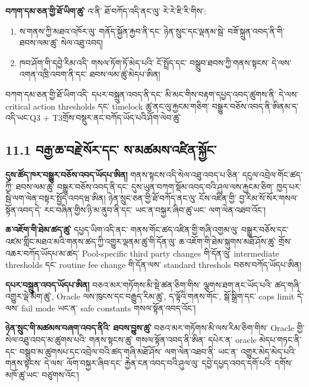 \documentclass[11pt]{article}
\begin{document}
\textbf{བཀག་དམ་ཅན་གྱི་ཐོ་ཡིག་ཚུ་} འ་ནི་ ཐོ་བཀོད་འདི་ནང་ལུ་ རེ་རེ་ཇི་རི་གིས་:

\begin{enumerate}[leftmargin=*]
\item ས་གནས་ཀྱི་མཐའ་འཁོར་ལུ་ གནོད་སྐྱོན་རྐྱབ་ནི་དང་ ཉེན་སྲུང་དང་ལྡནམ་སྦེ་ བཟོ་སྐྲུན་འབད་ནི་གི་ ཐབས་ལམ་ཚུ་ སེལ་འཐུ་འབད།
\item ཁབ་ཤོག་གི་དབྱེ་རིམ་འདི་ གསལ་ཏོག་ཏོ་མེད་པའི་ ངོ་སྤྲོད་དང་ བསྒྲུབ་ཐབས་ཀྱི་གནས་སྟངས་ དེ་ལས་ འགན་འཁྲི་འབག་ནི་དང་ ཐབས་ལམ་ཚུ་མེདཔ་ཨིན།
\end{enumerate}
བཀག་དམ་ཅན་གྱི་ཐོ་ཡིག་འདི་ དཔར་བསྐྲུན་འབད་ནི་དང་ མི་མང་གིས་བརྟག་དཔྱད་འབད་ཚུགས་ནི་ དེ་ལས་ critical action thresholds དང་ timelock ཚུ་ནང་ལུ་རྐྱངམ་གཅིག་ བསྒྱུར་བཅོས་འབད་ནི་ཨིནམ་ད་ འདི་ཡང་Q3 + T3གྲོས་བསྡུར་ནང་བཀོད་ཡོད་པའི་ཤོག་ལེབ་ཚུ་

\subsection*{11.1 བརྒྱ་ཆ་བརྗེ་སོར་དང་ ས་མཚམས་འཛིན་སྐྱོང་}

\textbf{དུས་ཚོད་ཁར་བསྒྱུར་བཅོས་འབད་ཡོདཔ་ཨིན།} གནས་སྟངས་འདི་སེལ་འཐུ་འབད་པ་ཅིན་ དངུལ་འབྲེལ་གོང་ཚད་ཀྱི་ ཐབས་ལམ་ཚུ་ བསྒྱུར་བཅོས་འབད་ནི་དང་ དུས་ཡུན་བཀག་སྡོམ་འབད་བའི་ཤུལ་ལས་རྐྱངམ་ཅིག་ ཁྱད་པར་སྦེ་ལག་ལེན་བསྟར་སྤྱོད་འབདཝ་ཨིན། ཉེན་སྲུང་ཅན་གྱི་ཐོ་བཀོད་ནང་ལུ་ ངོས་འཛིན་གྱི་ བྱ་རིམ་སོ་སོར་གསལ་སྟོན་འབད་དེ་ རང་བཞིན་གྱིས་ཉི་མ་ནུབ་ནི་དང་ ཡང་ན་བསྐྱར་ཞིབ་ཚུ་ཡང་ ལག་ལེན་འཐབ་འོང་།

\textbf{ཆ་འཇོག་གི་ཐེམ་ཚད་ཚུ་} དཔྱད་ཡིག་འདི་ནང་ གནས་གོང་ཚད་འཛིན་གྱི་གཞི་འགྱམ་ལུ་ བསྒྱུར་བཅོས་དང་ འཛམ་གླིང་མཐའ་མའི་གནས་ཚད་ཀྱི་འགྱུར་ལྡནམ་ཚུ་གི་དོན་ལུ་ ཆ་འཇོག་གི་ཐེམ་སྐུགས་མཐོ་ཤོས་ཚུ་ གྲོས་འཆར་བཀོད་ཡོདཔ་མ་ཚད་ Pool-specific third party changes གི་དོན་ལུ་ intermediate thresholds དང་ routine fee change གི་དོན་ལས་ standard threshols བཅས་བཀོད་ཡོདཔ་ཨིན།

\textbf{དཔར་བསྐྲུན་འབད་ཡོདཔ་ཨིན།} བཅའ་མར་གཏོགས་མི་སྡེ་ཚན་ཅིག་གིས་ ལྕགས་ཐག་ནང་ཡོད་པའི་ ཚད་གཞི་འགྱུར་ལྡེ་མིག་ཚུ་, Oracle ལས་ཁུངས་དང་བརྒྱུད་རིམ་ཚུ་, ད་ལྟོའི་གནས་གོང་, སྒོ་སྒྲིག་དང་ caps limit དེ་ལས་ fail mode ཡང་ན་ safe constants གསལ་སྟོན་འབད་འོང་།

\textbf{ཉེན་སྲུང་གི་མཚམས་བཞག་འབད་ནིའི་ ཐབས་བྱུས་ཚུ་} བཅའ་མར་གཏོགས་མི་ལས་རིམ་ཅིག་གིས་ Oracle གྱི་སེལ་འཐུ་འབད་མ་ཚུགས་པའི་ གནས་སྟངས་ཚུ་ གསལ་སྟོན་འབད་ནི་ཨིན་ དཔེར་ན་ oracle མེདཔ་གཏང་ནི་དང་ བསྒྲུབ་མ་ཚུགསཔ་དང་འབྲེལ་བའི་ཚད་གཞི་མཐོ་ཤོས་ ལག་ལེན་འཐབ་ནི་ ཡང་ན་ འགྱུར་མེད་མེད་པའི་གནས་སྟངས་ དེ་ལས་ ལོག་བསྐྱར་ཞིབ་དང་ རྐྱེན་ངན་འབད་བའི་ཤུལ་ལུ་ དབྱེ་དཔྱད་འབད་དགོ་པའི་ དགོས་མཁོ་ཚུ་ཡང་ བཙུགས་འོང་།
\end{document}
